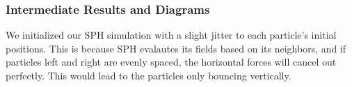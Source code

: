 \subsubsection{Intermediate Results and Diagrams}
We initialized our SPH simulation with a slight jitter to each particle's initial positions. This is because SPH evalautes its fields based on its neighbors,
and if particles left and right are evenly spaced, the horizontal forces will cancel out perfectly. This would lead to the particles only bouncing vertically.
